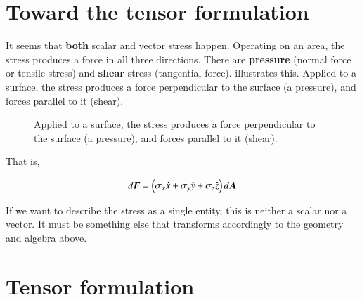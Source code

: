 \section{Toward the tensor formulation}

It seems that {\bf both} scalar and vector stress happen. Operating on
an area, the stress produces a force in all three directions. There
are {\bf pressure} (normal force or tensile stress) and {\bf shear} stress (tangential force).  illustrates this. Applied to a surface, the stress produces a force perpendicular to the surface (a pressure), and forces parallel to it (shear). 

\begin{figure}
  \begin{center}
  \end{center}
  \caption[]{Applied to a surface, the stress produces a force perpendicular to the surface (a pressure), and forces parallel to it (shear).}
  \label{fig:tensor6}
\end{figure}

\noindent That is, 

\begin{equation}
d{\boldsymbol{F}} = \left( \sigma_x \hat{x}+ \sigma_y \hat{y} + \sigma_z\hat{z}  \right) d{\boldsymbol{A}}
\label{eq:force-wrong}
\end{equation}

If we want to describe the stress as a single entity, this is neither
a scalar nor a vector. It must be something else that transforms
accordingly to the geometry and algebra above.

\section{Tensor formulation}

